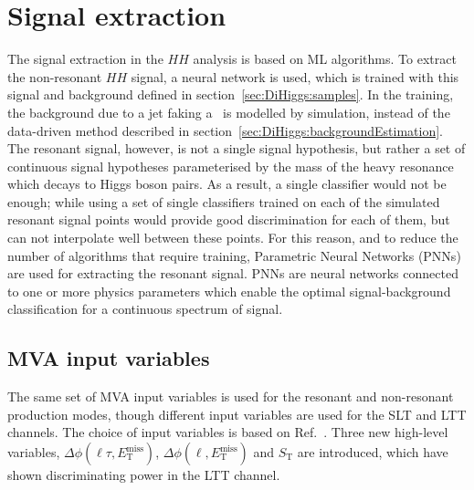 \newpage
\section{Signal extraction}
\label{sec:DiHiggs:MVA}
The signal extraction in the $HH$ analysis is based on ML algorithms.
To extract the non-resonant $HH$ signal, a neural network is used, 
which is trained with this signal and background defined 
in section~\ref{sec:DiHiggs:samples}. In the training, 
the background due to a jet faking a \tauhad\ is modelled 
by simulation, instead of the data-driven method described
in section~\ref{sec:DiHiggs:backgroundEstimation}.
The resonant signal, however, is not a single signal hypothesis, 
but rather a set of continuous signal hypotheses parameterised by 
the mass of the heavy resonance which decays to Higgs boson pairs.
As a result, a single classifier would not be enough;
while using a set of single classifiers trained on 
each of the simulated resonant signal points 
would provide good discrimination for each of them, 
but can not interpolate well between these points.
For this reason, and to reduce the number of algorithms 
that require training, 
Parametric Neural Networks (PNNs)~\cite{Baldi:2016fzo} are used  
for extracting the resonant signal. 
PNNs are neural networks connected to one or more physics parameters
which enable the optimal signal-background classification
for a continuous spectrum of signal. 

\subsection{MVA input variables}
The same set of MVA input variables is used for the resonant and non-resonant production modes, 
though different input variables are used for the SLT and LTT channels.
The choice of input variables is based on Ref.~\cite{HIGG-2016-16}.
Three new high-level variables, $\Delta\phi(\ell\tau, E_\text{T}^\text{miss})$,
$\Delta\phi(\ell, E_\text{T}^\text{miss})$ and 
$S_\text{T}$ are introduced, which have shown 
discriminating power in the LTT channel. 

